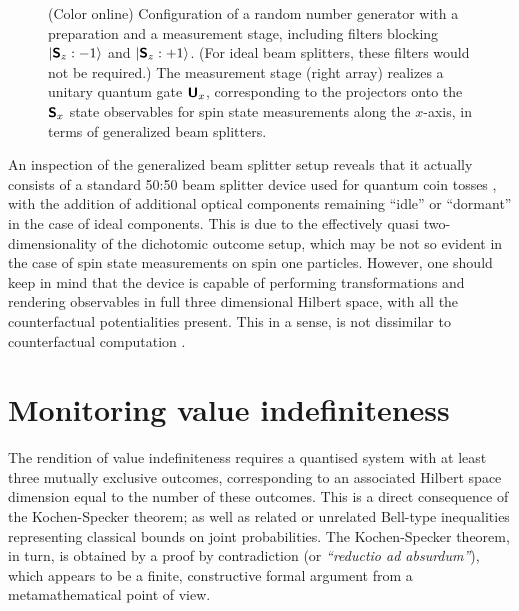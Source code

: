 \documentclass[11pt, a4paper]{article}
\theoremstyle{definition}
\begin{document}
\begin{figure}[ht]
\begin{center}
\end{center}
\caption{(Color online) Configuration of a random number generator
with a preparation and a measurement stage, including filters blocking
$\vert \textsf{\textbf{S}}_z : -1 \rangle$
and
$\vert \textsf{\textbf{S}}_z : +1 \rangle$.
(For ideal beam splitters, these filters would not be required.)
The measurement stage (right array) realizes a unitary quantum gate $\textsf{\textbf{U}}_x$, corresponding  to the projectors onto
the $\textsf{\textbf{S}}_x$ state observables for spin state measurements along the $x$-axis,
in terms of generalized beam splitters.
\label{2012-incomput-proofsC-f1}}
\end{figure}

An inspection of the generalized beam splitter setup reveals that it actually consists of a standard 50:50 beam splitter device
used for quantum coin tosses
\cite{svozil-qct,rarity-94,zeilinger:qct,stefanov-2000,0256-307X-21-10-027,wang:056107,fiorentino:032334,svozil-2009-howto,10.1038/nature09008},
with the addition of additional optical components remaining ``idle'' or ``dormant''
in the case of ideal components.
This is due to the effectively quasi two-dimensionality of the dichotomic outcome setup,
which may be not so evident in the case of spin state measurements on spin one particles.
However, one should keep in mind that
the device is capable of performing transformations and rendering observables in full three dimensional Hilbert space,
with all the counterfactual potentialities present.
This in a sense, is not dissimilar to counterfactual computation  \cite{elitzur-vaidman:1}.


\section{Monitoring value indefiniteness}

The rendition of value indefiniteness requires a quantised system with at least three mutually exclusive outcomes,
corresponding to an associated Hilbert space dimension equal to the number of these outcomes.
This is a direct consequence of the Kochen-Specker theorem; as well as related \cite{PhysRevLett.103.050401} or unrelated \cite{Pit-94}
Bell-type inequalities representing classical bounds on joint probabilities.
The Kochen-Specker theorem, in turn, is obtained by a proof by contradiction (or {\it ``reductio ad absurdum''}),
which appears to be a finite, constructive formal argument from a metamathematical point of view.
\end{document}
